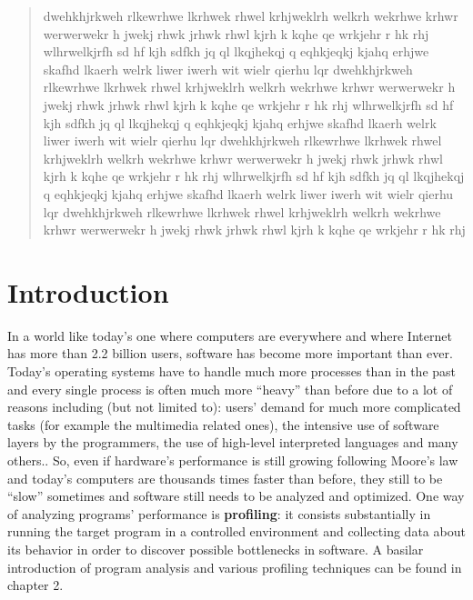 \documentclass[a4paper,11pt]{report}
\begin{document}
%
%
%
%
%
%

\begin{abstract}
dwehkhjrkweh rlkewrhwe lkrhwek rhwel krhjweklrh welkrh wekrhwe krhwr
werwerwekr h jwekj rhwk jrhwk rhwl kjrh k kqhe qe wrkjehr r hk rhj
wlhrwelkjrfh sd hf kjh sdfkh jq ql lkqjhekqj q eqhkjeqkj kjahq 
erhjwe skafhd lkaerh welrk liwer  iwerh wit wielr qierhu lqr 
dwehkhjrkweh rlkewrhwe lkrhwek rhwel krhjweklrh welkrh wekrhwe krhwr
werwerwekr h jwekj rhwk jrhwk rhwl kjrh k kqhe qe wrkjehr r hk rhj
wlhrwelkjrfh sd hf kjh sdfkh jq ql lkqjhekqj q eqhkjeqkj kjahq 
erhjwe skafhd lkaerh welrk liwer  iwerh wit wielr qierhu lqr 
dwehkhjrkweh rlkewrhwe lkrhwek rhwel krhjweklrh welkrh wekrhwe krhwr
werwerwekr h jwekj rhwk jrhwk rhwl kjrh k kqhe qe wrkjehr r hk rhj
wlhrwelkjrfh sd hf kjh sdfkh jq ql lkqjhekqj q eqhkjeqkj kjahq 
erhjwe skafhd lkaerh welrk liwer  iwerh wit wielr qierhu lqr 
dwehkhjrkweh rlkewrhwe lkrhwek rhwel krhjweklrh welkrh wekrhwe krhwr
werwerwekr h jwekj rhwk jrhwk rhwl kjrh k kqhe qe wrkjehr r hk rhj

\end{abstract}


\tableofcontents

\chapter{Introduction}

In a world like today's one where computers are everywhere and where \mbox{Internet} has more than 2.2 billion users, software has become more important than ever. Today's operating systems have to handle much more processes than in the past and every single process is often much more ``heavy'' than before due to a lot of reasons including (but not limited to): users' demand for much more complicated tasks (for example the multimedia related ones), the intensive use of software layers by the programmers, the use of high-level interpreted languages and many others.. 
So, even if hardware's performance is still growing following Moore's law and today's computers are thousands times faster than before, they still to be ``slow'' sometimes and software still needs to be analyzed and optimized.
One way of analyzing programs' performance is \textbf{profiling}: it consists substantially in running the target program in a controlled environment and collecting data about its behavior in order to discover possible bottlenecks in software.
A basilar introduction of program analysis and various profiling techniques can be found in chapter 2.
\end{document}
